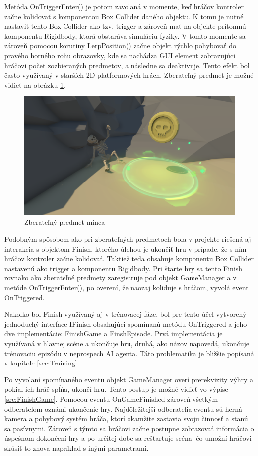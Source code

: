 \documentclass[slovak, master]{diploma}
\begin{document}
Metóda OnTriggerEnter() je potom zavolaná v momente, keď hráčov kontroler začne kolidovať s komponentou Box Collider daného objektu. K tomu je nutné nastaviť tento Box Collider ako tzv. trigger a zároveň mať na objekte prítomnú komponentu Rigidbody, ktorá obstaráva simuláciu fyziky. V tomto momente sa zároveň pomocou korutiny LerpPosition() začne objekt rýchlo pohybovať do pravého horného rohu obrazovky, kde sa nachádza GUI element zobrazujúci hráčovi počet zozbieraných predmetov, a následne sa deaktivuje. Tento efekt bol často využívaný v starších 2D platformových hrách. Zberateľný predmet je možné vidieť na obrázku \ref{pic:Pickup}.

\begin{figure}[!htbp]
    \centering
    \includegraphics[width=.8\textwidth]{Figures/pickup.png}
    \caption{Zberateľný predmet minca}
    \label{pic:Pickup}
\end{figure}

Podobným spôsobom ako pri zberateľných predmetoch bola v projekte riešená aj interakcia s objektom Finish, ktorého úlohou je ukončiť hru v prípade, že s ním hráčov kontroler začne kolidovať. Taktiež teda obsahuje komponentu Box Collider nastavenú ako trigger a komponentu Rigidbody. Pri štarte hry sa tento Finish rovnako ako zberateľné predmety zaregistruje pod objekt GameManager a v metóde \mbox{OnTriggerEnter()}, po overení, že naozaj koliduje s hráčom, vyvolá event \mbox{OnTriggered}. 

Nakoľko bol Finish využívaný aj v trénovacej fáze, bol pre tento účel vytvorený jednoduchý interface IFinish obsahujúci spomínanú metódu OnTriggered a jeho dve implementácie: FinishGame a FinshEpisode. Prvá implementácia je využívaná v hlavnej scéne a ukončuje hru, druhá, ako názov napovedá, ukončuje trénovaciu epizódu v neprospech AI agenta. Táto problematika je bližšie popísaná v kapitole \ref{sec:Training}.

Po vyvolaní spomínaného eventu objekt GameManager overí prerekvizity výhry a pokiaľ ich hráč spĺňa, ukončí hru. Tento postup je možné vidieť vo výpise \ref{src:FinishGame}. Pomocou eventu OnGameFinished zároveň všetkým odberateľom oznámi ukončenie hry. Najdôležitejší odberatelia eventu sú herná kamera a pohybový systém hráča, ktorí okamžite zastavia svoju činnosť a stanú sa pasívnymi. Zároveň s týmto sa hráčovi začne postupne zobrazovať informácia o úspešnom dokončení hry a po určitej dobe sa reštartuje scéna, čo umožní hráčovi skúsiť to znova napríklad s inými parametrami.
\end{document}
